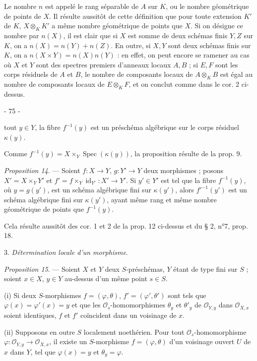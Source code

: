 Le nombre $n$ est appelé le rang séparable de $A$ sur $K$, ou le nombre géométrique de points de $X$. Il résulte aussitôt de cette définition que pour toute extension $K'$ de $K$, $X \otimes_K K'$ a même nombre géométrique de points que $X$. Si on désigne ce nombre par $n(X)$, il est clair que si $X$ est somme de deux schémas finis $Y, Z$ sur $K$, on a $n(X) = n(Y) + n(Z)$. En outre, si $X, Y$ sont deux schémas finis sur $K$, on a $n(X \times Y) = n(X)n(Y)$ : en effet, on peut encore se ramener au cas où $X$ et $Y$ sont des spectres premiers d'anneaux locaux $A, B$ ; si $E, F$ sont les corps résiduels de $A$ et $B$, le nombre de composants locaux de $A \otimes_K B$ est égal au nombre de composants locaux de $E \otimes_K F$, et on conclut comme dans le cor. 2 ci-dessus.

\newpage


- 75 -

tout $y \in Y$, la fibre $f^{-1}(y)$ est un préschéma algébrique sur le corps résiduel $\kappa(y)$.

Comme $f^{-1}(y) = X \times_Y \operatorname{Spec}(\kappa(y))$, la proposition résulte de la prop. 9.

\emph{Proposition 14}. — Soient $f : X \to Y$, $g : Y' \to Y$ deux morphismes ; posons $X' = X \times_Y Y'$ et $f' = f \times_Y \operatorname{id}_{Y'} : X' \to Y'$. Si $y' \in Y'$ est tel que la fibre $f^{-1}(y)$, où $y = g(y')$, est un schéma algébrique fini sur $\kappa(y')$, alors $f'^{-1}(y')$ est un schéma algébrique fini sur $\kappa(y')$, ayant même rang et même nombre géométrique de points que $f^{-1}(y)$.

Cela résulte aussitôt des cor. 1 et 2 de la prop. 12 ci-dessus et du § 2, n°7, prop. 18.

3. \emph{Détermination locale d'un morphisme}.

\emph{Proposition 15}. — Soient $X$ et $Y$ deux $S$-préschémas, $Y$ étant de type fini sur $S$ ; soient $x \in X$, $y \in Y$ au-dessus d'un même point $s \in S$.

(i) Si deux $S$-morphismes $f=(\varphi, \theta)$, $f'=(\varphi', \theta')$ sont tels que $\varphi(x) = \varphi'(x) = y$ et que les $\mathcal{O}_s$-homomorphismes $\theta_y$ et $\theta'_y$ de $\mathcal{O}_{Y,y}$ dans $\mathcal{O}_{X,x}$ soient identiques, $f$ et $f'$ coïncident dans un voisinage de $x$.

(ii) Supposons en outre $S$ localement noethérien. Pour tout $\mathcal{O}_s$-homomorphisme $\varphi : \mathcal{O}_{Y,y} \to \mathcal{O}_{X,x}$, il existe un $S$-morphisme $f=(\varphi, \theta)$ d'un voisinage ouvert $U$ de $x$ dans $Y$, tel que $\varphi(x) = y$ et $\theta_y = \varphi$.

